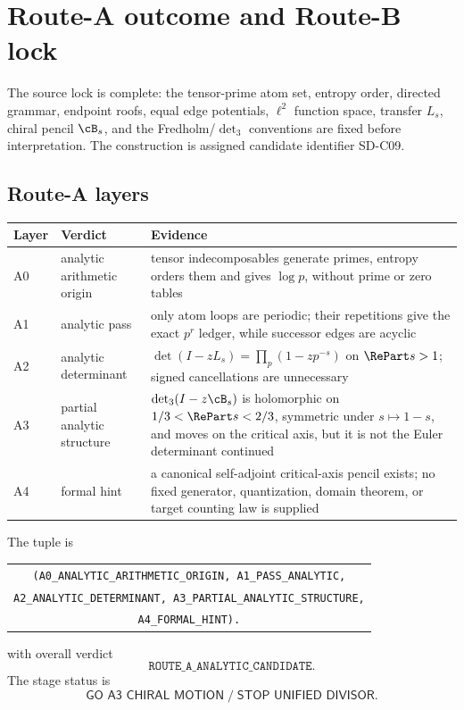 \section{Route-A outcome and Route-B lock}
\label{sec:route}

The source lock is complete: the tensor-prime atom set, entropy order,
directed grammar, endpoint roofs, equal edge potentials, $\ell^2$ function
space, transfer $L_s$, chiral pencil $\cB_s$, and the Fredholm/$\det_3$
conventions are fixed before interpretation.  The construction is assigned
candidate identifier SD-C09.

\subsection{Route-A layers}

\begin{center}
\small
\begin{tabularx}{0.99\textwidth}{L{0.08\textwidth}L{0.25\textwidth}X}
\toprule
Layer & Verdict & Evidence \\
\midrule
A0 & analytic arithmetic origin & tensor indecomposables generate primes, entropy orders them and gives $\log p$, without prime or zero tables \\
A1 & analytic pass & only atom loops are periodic; their repetitions give the exact $p^r$ ledger, while successor edges are acyclic \\
A2 & analytic determinant & $\det(I-zL_s)=\prod_p(1-zp^{-s})$ on $\RePart s>1$; signed cancellations are unnecessary \\
A3 & partial analytic structure & $\det_3(I-z\cB_s)$ is holomorphic on $1/3<\RePart s<2/3$, symmetric under $s\mapsto1-s$, and moves on the critical axis, but it is not the Euler determinant continued \\
A4 & formal hint & a canonical self-adjoint critical-axis pencil exists; no fixed generator, quantization, domain theorem, or target counting law is supplied \\
\bottomrule
\end{tabularx}
\end{center}

The tuple is
\begin{center}
\small
\begin{tabular}{c}
\texttt{(A0\_ANALYTIC\_ARITHMETIC\_ORIGIN, A1\_PASS\_ANALYTIC,}\\
\texttt{A2\_ANALYTIC\_DETERMINANT, A3\_PARTIAL\_ANALYTIC\_STRUCTURE,}\\
\texttt{A4\_FORMAL\_HINT).}
\end{tabular}
\end{center}
with overall verdict
\[
 \boxed{\texttt{ROUTE\_A\_ANALYTIC\_CANDIDATE}.}
\]
The stage status is
\[
 \boxed{\textsf{GO A3 CHIRAL MOTION}
 \;/\;
 \textsf{STOP UNIFIED DIVISOR}.}
\]

